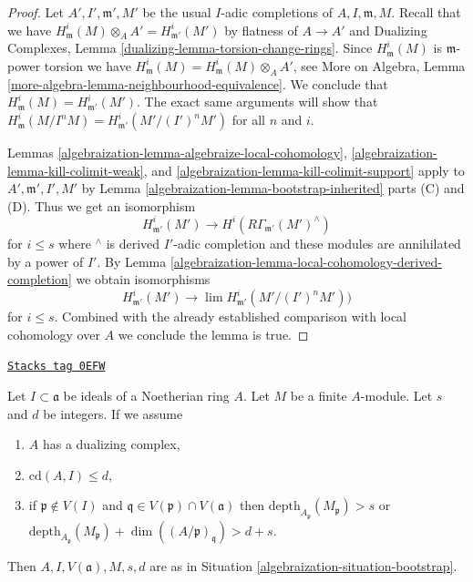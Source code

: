 \begin{proof}

Let $A', I', \mathfrak m', M'$ be the usual $I$-adic completions
of $A, I, \mathfrak m, M$. Recall that we have
$H^i_\mathfrak m(M) \otimes_A A' = H^i_{\mathfrak m'}(M')$
by flatness of $A \to A'$ and Dualizing Complexes, Lemma
\ref{dualizing-lemma-torsion-change-rings}.
Since $H^i_\mathfrak m(M)$ is $\mathfrak m$-power torsion we have
$H^i_\mathfrak m(M) = H^i_\mathfrak m(M) \otimes_A A'$, see
More on Algebra, Lemma \ref{more-algebra-lemma-neighbourhood-equivalence}.
We conclude that $H^i_\mathfrak m(M) = H^i_{\mathfrak m'}(M')$.
The exact same arguments will show that
$H^i_\mathfrak m(M/I^nM) =  H^i_{\mathfrak m'}(M'/(I')^nM')$
for all $n$ and $i$.

\medskip\noindent
Lemmas \ref{algebraization-lemma-algebraize-local-cohomology},
\ref{algebraization-lemma-kill-colimit-weak}, and
\ref{algebraization-lemma-kill-colimit-support}
apply to $A', \mathfrak m', I', M'$ by
Lemma \ref{algebraization-lemma-bootstrap-inherited} parts (C) and (D).
Thus we get an isomorphism
$$
H^i_{\mathfrak m'}(M') \longrightarrow H^i(R\Gamma_{\mathfrak m'}(M')^\wedge)
$$
for $i \leq s$ where ${}^\wedge$ is derived $I'$-adic completion and these
modules are annihilated by a power of $I'$.
By Lemma \ref{algebraization-lemma-local-cohomology-derived-completion}
we obtain isomorphisms
$$
H^i_{\mathfrak m'}(M') \longrightarrow
\lim H^i_{\mathfrak m'}(M'/(I')^nM'))
$$
for $i \leq s$. Combined with the already established comparison
with local cohomology over $A$ we conclude the lemma is true.
\end{proof}

\begin{lemma}
\label{algebraization-lemma-bootstrap-bis-bis}
\href{https://stacks.math.columbia.edu/tag/0EFW}{\texttt{Stacks tag 0EFW}}

Let $I \subset \mathfrak a$ be ideals of a Noetherian ring $A$.
Let $M$ be a finite $A$-module. Let $s$ and $d$ be integers.
If we assume
\begin{enumerate}
\item[(a)] $A$ has a dualizing complex,
\item[(b)] $\text{cd}(A, I) \leq d$,
\item[(c)] if $\mathfrak p \not \in V(I)$ and
$\mathfrak q \in V(\mathfrak p) \cap V(\mathfrak a)$ then
$\text{depth}_{A_\mathfrak p}(M_\mathfrak p) > s$ or
$\text{depth}_{A_\mathfrak p}(M_\mathfrak p) +
\dim((A/\mathfrak p)_\mathfrak q) > d + s$.
\end{enumerate}
Then $A, I, V(\mathfrak a), M, s, d$ are as in
Situation \ref{algebraization-situation-bootstrap}.
\end{lemma}

